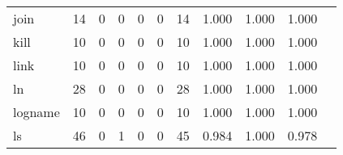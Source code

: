 \begin{longtable}{lp{1.20cm}p{1.20cm}p{1.20cm}p{1.20cm}p{1.20cm}p{1.20cm}p{1.20cm}p{1.20cm}p{1.20cm}p{1.20cm}}
join      &                                    14 &                                                  0 &                                                  0 &                                                  0 &                                                  0 &                                                 14 &                                         1.000 &                                              1.000 &                                              1.000 \\
kill      &                                    10 &                                                  0 &                                                  0 &                                                  0 &                                                  0 &                                                 10 &                                         1.000 &                                              1.000 &                                              1.000 \\
link      &                                    10 &                                                  0 &                                                  0 &                                                  0 &                                                  0 &                                                 10 &                                         1.000 &                                              1.000 &                                              1.000 \\
ln        &                                    28 &                                                  0 &                                                  0 &                                                  0 &                                                  0 &                                                 28 &                                         1.000 &                                              1.000 &                                              1.000 \\
logname   &                                    10 &                                                  0 &                                                  0 &                                                  0 &                                                  0 &                                                 10 &                                         1.000 &                                              1.000 &                                              1.000 \\
ls        &                                    46 &                                                  0 &                                                  1 &                                                  0 &                                                  0 &                                                 45 &                                         0.984 &                                              1.000 &                                              0.978 \\

\end{longtable}
